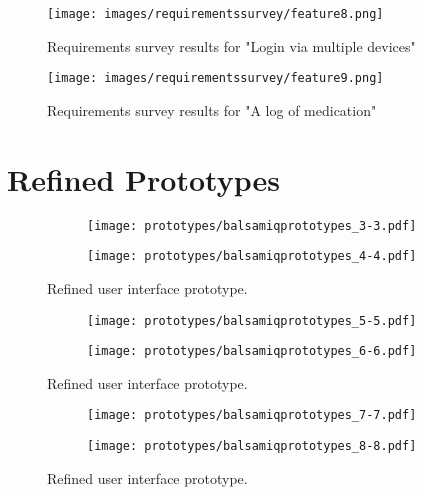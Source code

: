 \documentclass{l4proj}
\begin{document}
\begin{appendices}
\begin{figure}
    \centering
    \texttt{[image: images/requirementssurvey/feature8.png]}
    \caption{Requirements survey results for "Login via multiple devices"}
    \label{fig:req8results}
\end{figure}

\begin{figure}
    \centering
    \texttt{[image: images/requirementssurvey/feature9.png]}
    \caption{Requirements survey results for "A log of medication"}
    \label{fig:req9results}
\end{figure}

\chapter{Refined Prototypes}

\begin{figure}[!ht]
    \centering
    \begin{subfigure}[b]{0.45\textwidth}
        \texttt{[image: prototypes/balsamiqprototypes\_3-3.pdf]}
        \label{fig:ref}
    \end{subfigure}
    \begin{subfigure}[b]{0.45\textwidth}
        \texttt{[image: prototypes/balsamiqprototypes\_4-4.pdf]}
        \label{fig:ref0}
    \end{subfigure}    
    \caption{Refined user interface prototype.}
    \label{fig:prototypes1}
\end{figure}

\begin{figure}[!ht]
    \centering
    \begin{subfigure}[b]{0.45\textwidth}
        \texttt{[image: prototypes/balsamiqprototypes\_5-5.pdf]}
        \label{fig:ref1}
    \end{subfigure}
    \begin{subfigure}[b]{0.45\textwidth}
        \texttt{[image: prototypes/balsamiqprototypes\_6-6.pdf]}
        \label{fig:ref2}
    \end{subfigure}
    \caption{Refined user interface prototype.}
    \label{fig:prototypes2}
\end{figure}


\begin{figure}[!ht]
    \centering
    \begin{subfigure}[b]{0.45\textwidth}
        \texttt{[image: prototypes/balsamiqprototypes\_7-7.pdf]}
        \label{fig:ref3}
    \end{subfigure}
    \begin{subfigure}[b]{0.45\textwidth}
        \texttt{[image: prototypes/balsamiqprototypes\_8-8.pdf]}
        \label{fig:ref4}
    \end{subfigure}
    \caption{Refined user interface prototype.}
    \label{fig:prototypes3}
\end{figure}


\end{appendices}
\end{document}

